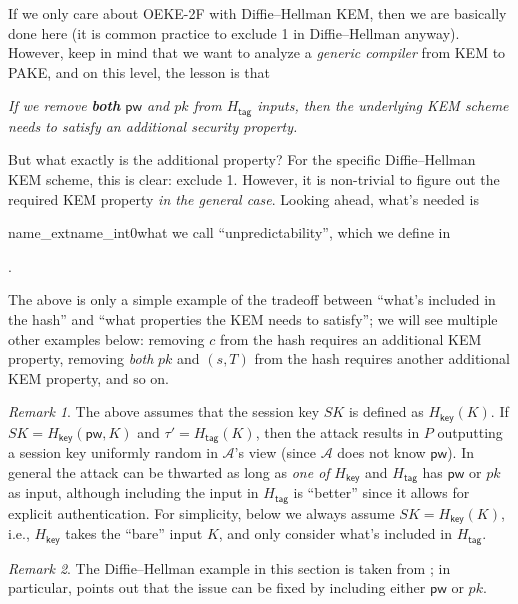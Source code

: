 \documentclass{article}
\theoremstyle{plain}
\theoremstyle{definition}
\theoremstyle{remark}
\newtheorem{remark}{Remark}
\newcommand{\adv}{\mathcal{A}}
\newcommand{\Hkey}{H_\mathsf{key}}
\newcommand{\Htag}{H_\mathsf{tag}}
\newcommand{\pw}{\mathsf{pw}}
\begin{document}
If we only care about OEKE-2F with Diffie--Hellman KEM, then we are basically done here (it is common practice to exclude 1 in Diffie--Hellman anyway). However, keep in mind that we want to analyze a \emph{generic compiler} from KEM to PAKE, and on this level, the lesson is that
\begin{framed}
\begin{displayquote}
  \emph{If we remove \textbf{both} $\pw$ and $pk$ from $\Htag$ inputs, then the underlying KEM scheme needs to satisfy an additional security property.}
\end{displayquote}
\end{framed}
But what exactly is the additional property? For the specific Diffie--Hellman KEM scheme, this is clear: exclude 1. However, it is non-trivial to figure out the required KEM property \emph{in the general case}. Looking ahead, what's needed is 
\begin{ocg}{name_ext}{name_int}{0}what we call ``unpredictability'', which we define in \end{ocg}.

The above is only a simple example of the tradeoff between ``what's included in the hash'' and ``what properties the KEM needs to satisfy''; we will see multiple other examples below: removing $c$ from the hash requires an additional KEM property, removing \emph{both} $pk$ and $(s,T)$ from the hash requires another additional KEM property, and so on.
\begin{remark}
The above assumes that the session key $SK$ is defined as $\Hkey(K)$. If $SK = \Hkey(\pw,K)$ and $\tau' = \Htag(K)$, then the attack results in $P$ outputting a session key uniformly random in $\adv$'s view (since $\adv$ does not know $\pw$). In general the attack can be thwarted as long as \emph{one of} $\Hkey$ and $\Htag$ has $\pw$ or $pk$ as input, although including the input in $\Htag$ is ``better'' since it allows for explicit authentication. For simplicity, below we always assume $SK = \Hkey(K)$, i.e., $\Hkey$ takes the ``bare'' input $K$, and only consider what's included in $\Htag$.
\end{remark}
\begin{remark}
The Diffie--Hellman example in this section is taken from \cite[Section~3.1]{EC:JanRoyXu25}; in particular, \cite[Remark~3.3]{EC:JanRoyXu25} points out that the issue can be fixed by including either $\pw$ or $pk$.
\end{remark}
\end{document}
